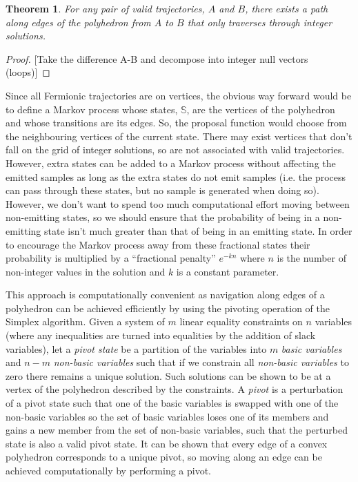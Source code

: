 \documentclass{article}
\newtheorem{theorem}{Theorem}
\begin{document}
\begin{theorem}
For any pair of valid trajectories, $A$ and $B$, there exists a path along edges of the polyhedron from $A$ to $B$ that only traverses through integer solutions.
\end{theorem}
\begin{proof}

[Take the difference A-B and decompose into integer null vectors (loops)]

\end{proof}

Since all Fermionic trajectories are on vertices, the obvious way forward would be to define a Markov process whose states, $\mathbb{S}$, are the vertices of the polyhedron and whose transitions are its edges. So, the proposal function would choose from the neighbouring vertices of the current state. There may exist vertices that don't fall on the grid of integer solutions, so are not associated with valid trajectories. However, extra states can be added to a Markov process without affecting the emitted samples as long as the extra states do not emit samples (i.e. the process can pass through these states, but no sample is generated when doing so). However, we don't want to spend too much computational effort moving between non-emitting states, so we should ensure that the probability of being in a non-emitting state isn't much greater than that of being in an emitting state. In order to encourage the Markov process away from these fractional states their probability is multiplied by a ``fractional penalty'' $e^{-kn}$ where $n$ is the number of non-integer values in the solution and $k$ is a constant parameter.

This approach is computationally convenient as navigation along edges of a polyhedron can be achieved efficiently by using the pivoting operation of the Simplex algorithm\cite{dantzig1955generalized}\cite{thie2011introduction}. Given a system of $m$ linear equality constraints on $n$ variables (where any inequalities are turned into equalities by the addition of slack variables), let a \textit{pivot state} be a partition of the variables into $m$ \textit{basic variables} and $n-m$ \textit{non-basic variables} such that if we constrain all \textit{non-basic variables} to zero there remains a unique solution. Such solutions can be shown to be at a vertex of the polyhedron described by the constraints. A \textit{pivot} is a perturbation of a pivot state such that one of the basic variables is swapped with one of the non-basic variables so the set of basic variables loses one of its members and gains a new member from the set of non-basic variables, such that the perturbed state is also a valid pivot state. It can be shown that every edge of a convex polyhedron corresponds to a unique pivot, so moving along an edge can be achieved computationally by performing a pivot.
\end{document}
